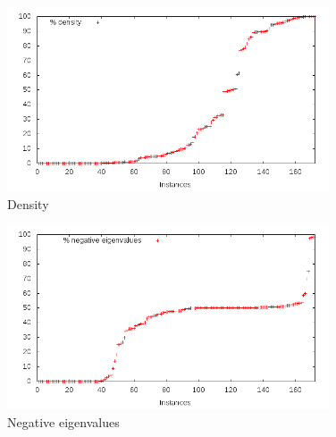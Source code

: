 


\begin{figure}\centering
  \includegraphics[width=0.85\textwidth]{pic_density.png}
  \caption{Density \label{fig:pic_density}}
\end{figure}

\begin{figure}\centering
  \includegraphics[width=0.85\textwidth]{pic_neg_eig.png}
  \caption{Negative eigenvalues \label{fig:pic_neg_eig}}
\end{figure}

















